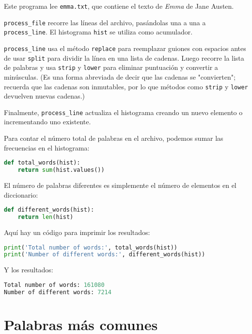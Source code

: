 Este programa lee \texttt{emma.txt}, que contiene el texto de \textit{Emma} de Jane Austen.

\texttt{process\_file} recorre las líneas del archivo, pasándolas una a una a \texttt{process\_line}. El histograma \texttt{hist} se utiliza como acumulador.

\texttt{process\_line} usa el método \texttt{replace} para reemplazar guiones con espacios antes de usar \texttt{split} para dividir la línea en una lista de cadenas. Luego recorre la lista de palabras y usa \texttt{strip} y \texttt{lower} para eliminar puntuación y convertir a minúsculas. (Es una forma abreviada de decir que las cadenas se "convierten"; recuerda que las cadenas son inmutables, por lo que métodos como \texttt{strip} y \texttt{lower} devuelven nuevas cadenas.)

Finalmente, \texttt{process\_line} actualiza el histograma creando un nuevo elemento o incrementando uno existente.

Para contar el número total de palabras en el archivo, podemos sumar las frecuencias en el histograma:

\begin{lstlisting}[language=Python]
def total_words(hist):
    return sum(hist.values())
\end{lstlisting}

El número de palabras diferentes es simplemente el número de elementos en el diccionario:

\begin{lstlisting}[language=Python]
def different_words(hist):
    return len(hist)
\end{lstlisting}

Aquí hay un código para imprimir los resultados:

\begin{lstlisting}[language=Python]
print('Total number of words:', total_words(hist))
print('Number of different words:', different_words(hist))
\end{lstlisting}

Y los resultados:

\begin{lstlisting}[language=Python]
Total number of words: 161080
Number of different words: 7214
\end{lstlisting}

\section{Palabras más comunes}

